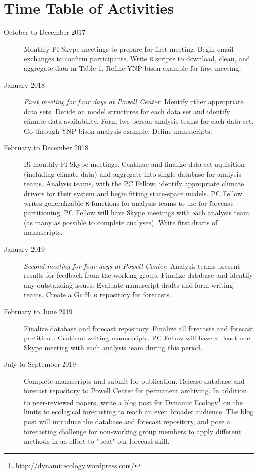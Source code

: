 \documentclass[12pt,]{article}
\let\rmarkdownfootnote\footnote%
\def\footnote{\protect\rmarkdownfootnote}
\begin{document}
\section{Time Table of Activities}\begin{description}

\item[October to December 2017] Monthly PI Skype meetings to prepare for first meeting. Begin email exchanges to confirm participants. Write \texttt{R} scripts to download, clean, and aggregate data in Table 1. Refine YNP bison example for first meeting.
\item[January 2018] \textit{First meeting for four days at Powell Center}: Identify other appropriate data sets. Decide on model structures for each data set and identify climate data availability. Form two-person analysis teams for each data set. Go through YNP bison analysis example. Define manuscripts.
\item[February to December 2018] Bi-monthly PI Skype meetings. Continue and finalize data set aquisition (including climate data) and aggregate into single database for analysis teams. Analysis teams, with the PC Fellow, identify appropriate climate drivers for their system and begin fitting state-space models. PC Fellow writes generalizable \texttt{R} functions for analysis teams to use for forecast partitioning. PC Fellow will have Skype meetings with each analysis team (as many as possible to complete analyses). Write first drafts of manuscripts.
\item[January 2019] \textit{Second meeting for four days at Powell Center}: Analysis teams present results for feedback from the working group. Finalize database and identify any outstanding issues. Evaluate manuscript drafts and form writing teams. Create a \textsc{GitHub} repository for forecasts.
\item[February to June 2019] Finalize database and forecast repository. Finalize all forecasts and forecast partitions. Continue writing manuscripts. PC Fellow will have at least one Skype meeting with each analysis team during this period.
\item[July to September 2019] Complete manuscripts and submit for publication. Release database and forecast repository to Powell Center for permanent archiving. In addition to peer-reviewed papers, write a blog post for Dynamic Ecology\footnote{http://dynamicecology.wordpress.com/} on the limits to ecological forecasting to reach an even broader audience. The blog post will introduce the database and forecast repository, and pose a forecasting challenge for non-working group members to apply different methods in an effort to "beat" our forecast skill.

\end{description}
\end{document}

